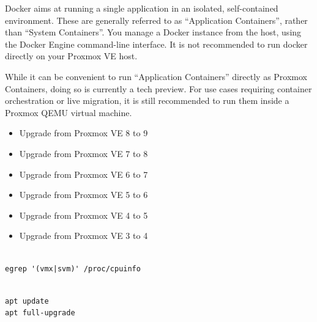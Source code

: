 Docker aims at running a single application in an isolated, self-contained environment. These are generally referred to as “Application Containers”, rather than “System Containers”. You manage a Docker instance from the host, using the Docker Engine command-line interface. It is not recommended to run docker directly on your Proxmox VE host.

While it can be convenient to run “Application Containers” directly as Proxmox Containers, doing so is currently a tech preview. For use cases requiring container orchestration or live migration, it is still recommended to run them inside a Proxmox QEMU virtual machine.

\begin{itemize}[leftmargin=2cm]

	\item Upgrade from Proxmox VE 8 to 9

	\item Upgrade from Proxmox VE 7 to 8

	\item Upgrade from Proxmox VE 6 to 7

	\item Upgrade from Proxmox VE 5 to 6

	\item Upgrade from Proxmox VE 4 to 5

	\item Upgrade from Proxmox VE 3 to 4

\end{itemize}

\begin{lstlisting}

egrep '(vmx|svm)' /proc/cpuinfo

\end{lstlisting}

\begin{lstlisting}

apt update
apt full-upgrade

\end{lstlisting}

\begin{table}[htbp]

\centering

\begin{tabular}

\end{tabular}

\end{table}

\begin{table}[htbp]

\centering

\begin{tabular}

\end{tabular}

\end{table}

